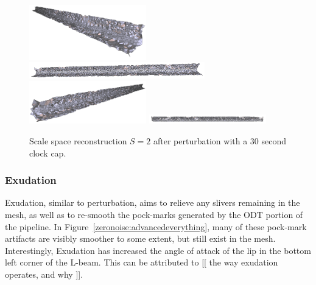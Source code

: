 \documentclass[12pt]{drexelthesis}
\let\Oldsubsubsection\subsubsection
\renewcommand{\subsubsection}{\FloatBarrier\Oldsubsubsection}
\begin{document}
\begin{figure}[!ht]
	
	\centering
		\includegraphics[width=2in]{simulated-lab-scan/0noise/optimized/scalespace2perturb00.png}
		\includegraphics[width=3in]{simulated-lab-scan/0noise/optimized/scalespace2perturb01.png}
		\includegraphics[width=2in]{simulated-lab-scan/0noise/optimized/scalespace2perturb02.png}
		\includegraphics[width=2in]{simulated-lab-scan/0noise/optimized/scalespace2perturb03.png}
		\caption[Scale space reconstruction $S = 2$ after perturbation with a 30 second clock cap]{\centering Scale space reconstruction $S = 2$ after perturbation with a 30 second clock cap.}
	\label{zeronoise:scalespace2perturb}
\end{figure}




\subsubsection{Exudation}

Exudation, similar to perturbation, aims to relieve any slivers remaining in the mesh, as well as to re-smooth the pock-marks generated by the ODT portion of the pipeline. In Figure~\ref{zeronoise:advancedeverything}, many of these pock-mark artifacts are visibly smoother to some extent, but still exist in the mesh. Interestingly, Exudation has increased the angle of attack of the lip in the bottom left corner of the L-beam. This can be attributed to [[ the way exudation operates, and why ]].
\end{document}
